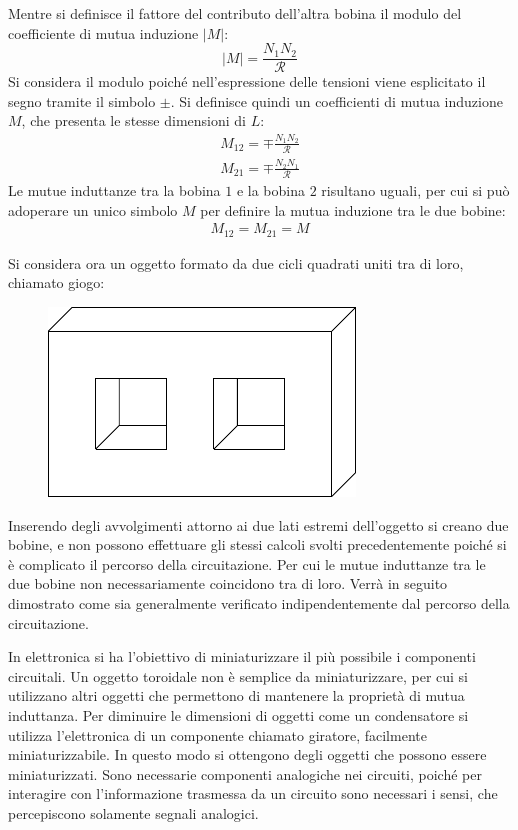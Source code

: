 \documentclass{article}
\numberwithin{equation}{subsection}
\begin{document}
Mentre si definisce il fattore del contributo dell'altra bobina il modulo del coefficiente di mutua induzione $|M|$:
\begin{equation}
    |M|=\displaystyle\frac{N_1 N_2}{\mathscr{R}}
\end{equation}
Si considera il modulo poiché nell'espressione delle tensioni viene esplicitato il segno tramite il simbolo $\pm$. Si definisce quindi un coefficienti di mutua induzione $M$, 
che presenta le stesse dimensioni di $L$:
\begin{gather*}
    M_{12}=\mp\displaystyle\frac{N_1 N_2}{\mathscr{R}}\\
    M_{21}=\mp\displaystyle\frac{N_2 N_1}{\mathscr{R}}
\end{gather*}
Le mutue induttanze tra la bobina $1$ e la bobina $2$ risultano uguali, per cui si può adoperare un unico simbolo $M$ per definire la mutua induzione tra le due bobine:
\begin{gather*}
    M_{12}=M_{21}=M
\end{gather*}

Si considera ora un oggetto formato da due cicli quadrati uniti tra di loro, chiamato giogo:
\begin{figure}[H]%
    \centering
    \includegraphics{giogo.pdf}%
    \label{fig:giogo}
\end{figure}

Inserendo degli avvolgimenti attorno ai due lati estremi dell'oggetto si creano due bobine, e non possono effettuare gli stessi calcoli svolti precedentemente poiché si è 
complicato il percorso della circuitazione. Per cui le mutue induttanze tra le due bobine non necessariamente coincidono tra di loro. Verrà in seguito dimostrato come sia 
generalmente verificato indipendentemente dal percorso della circuitazione. 


In elettronica si ha l'obiettivo di miniaturizzare il più possibile i componenti circuitali. Un oggetto toroidale non è semplice da miniaturizzare, per cui si utilizzano 
altri oggetti che permettono di mantenere la proprietà di mutua induttanza. 
Per diminuire le dimensioni di oggetti come un condensatore si utilizza l'elettronica di un componente chiamato giratore, facilmente miniaturizzabile. In questo modo si 
ottengono degli oggetti che possono essere miniaturizzati. 
Sono necessarie componenti analogiche nei circuiti, poiché per interagire con l'informazione trasmessa da un circuito sono necessari i sensi, che percepiscono solamente 
segnali analogici. 
\end{document}
